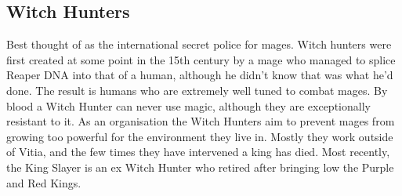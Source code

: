 \documentclass{article}
\begin{document}
\begin{multicols}{2}
{\subsection{Witch Hunters}
Best thought of as the international secret police for mages. Witch hunters were first created at some point in the 15th century by a mage who managed to splice Reaper DNA into that of a human, although he didn't know that was what he'd done. The result is humans who are extremely well tuned to combat mages. By blood a Witch Hunter can never use magic, although they are exceptionally resistant to it. As an organisation the Witch Hunters aim to prevent mages from growing too powerful for the environment they live in. Mostly they work outside of Vitia, and the few times they have intervened a king has died. Most recently, the King Slayer is an ex Witch Hunter who retired after bringing low the Purple and Red Kings.
}
\end{multicols}
\end{document}
